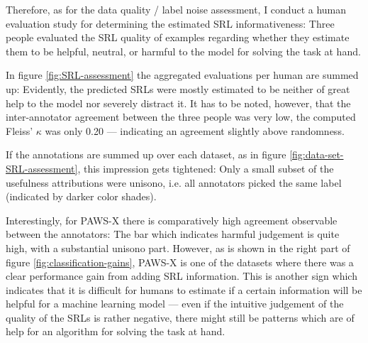 {Therefore, as for the data quality / label noise assessment, I conduct a human evaluation study
for determining the estimated SRL informativeness: Three people evaluated the SRL quality of examples regarding
whether they estimate them to be helpful, neutral, or harmful to the model for solving
the task at hand.

In figure \ref{fig:SRL-assessment} the aggregated evaluations per human are summed up:
Evidently, the predicted SRLs were mostly estimated to be neither of great help to the model
nor severely distract it. It has to be noted, however, that the inter-annotator agreement between
the three people was very low, the computed Fleiss' $\kappa$ was only 0.20 --- indicating
an agreement slightly above randomness.

If the annotations are summed up over each dataset, as in figure \ref{fig:data-set-SRL-assessment},
this impression gets tightened: Only a small subset of the usefulness attributions were unisono,
i.e. all annotators picked the same label (indicated by darker color shades).


Interestingly, for PAWS-X there is comparatively high agreement observable between the annotators:
The bar which indicates harmful judgement is quite high, with a substantial unisono part. However,
as is shown in the right part of figure \ref{fig:classification-gains}, PAWS-X is one of the datasets
where there was a clear performance gain from adding SRL information. This is another sign which
indicates that it is difficult for humans to estimate if a certain information will be helpful for
a machine learning model --- even if the intuitive judgement of the quality of the SRLs is rather
negative, there might still be patterns which are of help for an algorithm for solving the task at
hand.






}

